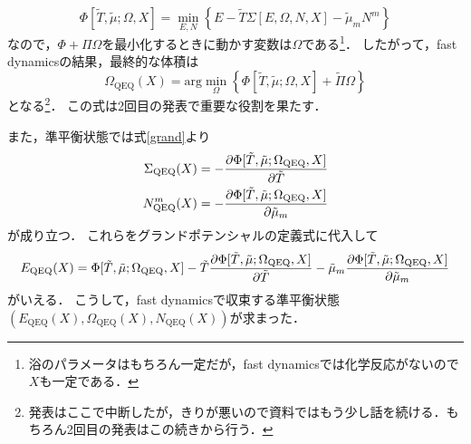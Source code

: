 \documentclass[a4paper,11pt]{jsarticle}
\theoremstyle{definition}
\begin{document}
\begin{equation}
  \Phi [\tilde{T}, \tilde{\mu}; \Omega, X] = \min_{E, N} \left\{ E - \tilde{T} \Sigma[E, \Omega, N, X] - \tilde{\mu}_m N^m \right\}
\end{equation}
なので，$\Phi + \Pi \Omega$を最小化するときに動かす変数は$\Omega$である\footnote{浴のパラメータはもちろん一定だが，fast dynamicsでは化学反応がないので$X$も一定である．}．
したがって，fast dynamicsの結果，最終的な体積は
\begin{equation}
  \Omega_{\mathrm{QEQ}}(X) = \mathrm{arg}\min_{\Omega} \left\{ \Phi [\tilde{T}, \tilde{\mu}; \Omega, X]  + \tilde{\Pi} \Omega \right\}
\end{equation}
となる\footnote{発表はここで中断したが，きりが悪いので資料ではもう少し話を続ける．もちろん2回目の発表はこの続きから行う．}．
この式は2回目の発表で重要な役割を果たす．

また，準平衡状態では式\eqref{grand}より
\begin{align}
  \Sigma_{\mathrm{QEQ}}(X) &= - \pdv{\Phi [\tilde{T}, \tilde{\mu}; \Omega_{\mathrm{QEQ}}, X]}{\tilde{T}} \\
  N^m_{\mathrm{QEQ}}(X) &= - \pdv{\Phi [\tilde{T}, \tilde{\mu}; \Omega_{\mathrm{QEQ}}, X]}{\tilde{\mu}_m}
\end{align}
が成り立つ．
これらをグランドポテンシャルの定義式に代入して
\begin{equation}
  E_{\mathrm{QEQ}}(X) = \Phi [\tilde{T}, \tilde{\mu}; \Omega_{\mathrm{QEQ}}, X] - \tilde{T} \pdv{\Phi [\tilde{T}, \tilde{\mu}; \Omega_{\mathrm{QEQ}}, X]}{\tilde{T}} - \tilde{\mu}_m \pdv{\Phi [\tilde{T}, \tilde{\mu}; \Omega_{\mathrm{QEQ}}, X]}{\tilde{\mu}_m}
\end{equation}
がいえる．
こうして，fast dynamicsで収束する準平衡状態$(E_{\mathrm{QEQ}}(X), \Omega_{\mathrm{QEQ}}(X), N_{\mathrm{QEQ}}(X))$が求まった．
\end{document}

